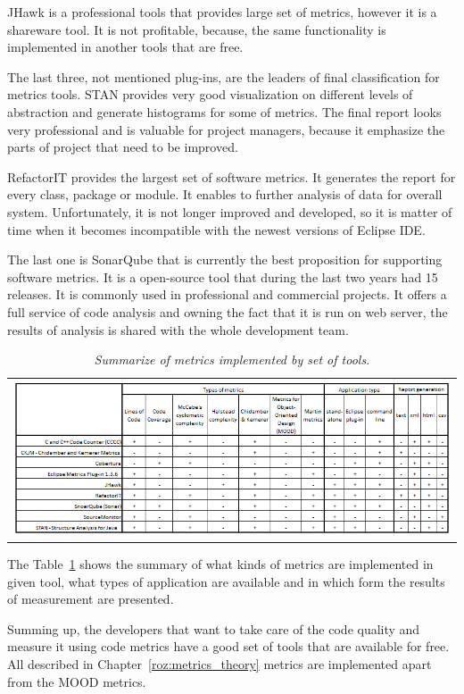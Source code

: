 JHawk is a professional tools that provides large set of metrics, however it is a shareware tool. It is not profitable, because, the same functionality is implemented in another tools that are free.      

The last three, not mentioned plug-ins, are the leaders of final classification for metrics tools. STAN provides very good visualization on different levels of abstraction and generate histograms for some of metrics. The final report looks very professional and is valuable for project managers, because it emphasize the parts of project that need to be improved.

RefactorIT provides the largest set of software metrics. It generates the report for every class, package or module. It enables to further analysis of data for overall system. Unfortunately, it is not longer improved and developed, so it is matter of time when it becomes incompatible with the newest versions of Eclipse \ac{IDE}. 

The last one is SonarQube that is currently the best proposition for supporting software metrics. It is a open-source tool that during the last two years had 15 releases. It is commonly used in professional and commercial projects. It offers a full service of code analysis and owning the fact that it is run on web server, the results of analysis is shared with the whole development team.  

\begin{table}[h!]
	\centering
	\begin{tabular}{l}
		\includegraphics[scale=0.7]{img/tools.png} \\
	\end{tabular}	
		\caption{\textit{Summarize of metrics implemented by set of tools.}}
		\label{tab:summarytools}
\end{table}

The Table~\ref{tab:summarytools} shows the summary of what kinds of metrics are implemented in given tool, what types of application are available and in which form the results of measurement are presented.

Summing up, the developers that want to take care of the code quality and measure it using code metrics have a good set of tools that are available for free.  All described in Chapter~\ref{roz:metrics_theory} metrics are implemented apart from the MOOD metrics. 
